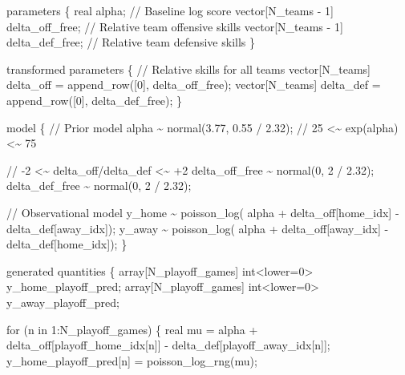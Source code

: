 \documentclass[
  letterpaper,
  DIV=11,
  numbers=noendperiod]{scrartcl}
\newenvironment{Shaded}{\begin{snugshade}}{\end{snugshade}}
\newcommand{\CommentTok}[1]{\textcolor[rgb]{0.37,0.37,0.37}{#1}}
\newcommand{\ControlFlowTok}[1]{\textcolor[rgb]{0.00,0.23,0.31}{#1}}
\newcommand{\DataTypeTok}[1]{\textcolor[rgb]{0.68,0.00,0.00}{#1}}
\newcommand{\DecValTok}[1]{\textcolor[rgb]{0.68,0.00,0.00}{#1}}
\newcommand{\FloatTok}[1]{\textcolor[rgb]{0.68,0.00,0.00}{#1}}
\newcommand{\KeywordTok}[1]{\textcolor[rgb]{0.00,0.23,0.31}{#1}}
\newcommand{\NormalTok}[1]{\textcolor[rgb]{0.00,0.23,0.31}{#1}}
\begin{document}
\begin{codelisting}
\begin{Shaded}
\begin{Highlighting}[]
\KeywordTok{parameters}\NormalTok{ \{}
  \DataTypeTok{real}\NormalTok{ alpha;                         }\CommentTok{// Baseline log score}
  \DataTypeTok{vector}\NormalTok{[N\_teams {-} }\DecValTok{1}\NormalTok{] delta\_off\_free; }\CommentTok{// Relative team offensive skills}
  \DataTypeTok{vector}\NormalTok{[N\_teams {-} }\DecValTok{1}\NormalTok{] delta\_def\_free; }\CommentTok{// Relative team defensive skills}
\NormalTok{\}}

\KeywordTok{transformed parameters}\NormalTok{ \{}
  \CommentTok{// Relative skills for all teams}
  \DataTypeTok{vector}\NormalTok{[N\_teams] delta\_off = append\_row([}\DecValTok{0}\NormalTok{]\textquotesingle{}, delta\_off\_free);}
  \DataTypeTok{vector}\NormalTok{[N\_teams] delta\_def = append\_row([}\DecValTok{0}\NormalTok{]\textquotesingle{}, delta\_def\_free);}
\NormalTok{\}}

\KeywordTok{model}\NormalTok{ \{}
  \CommentTok{// Prior model}
\NormalTok{  alpha \textasciitilde{} normal(}\FloatTok{3.77}\NormalTok{, }\FloatTok{0.55}\NormalTok{ / }\FloatTok{2.32}\NormalTok{); }\CommentTok{// 25 \textless{}\textasciitilde{}  exp(alpha) \textless{}\textasciitilde{} 75}

  \CommentTok{// {-}2 \textless{}\textasciitilde{} delta\_off/delta\_def \textless{}\textasciitilde{} +2}
\NormalTok{  delta\_off\_free \textasciitilde{} normal(}\DecValTok{0}\NormalTok{, }\DecValTok{2}\NormalTok{ / }\FloatTok{2.32}\NormalTok{);}
\NormalTok{  delta\_def\_free \textasciitilde{} normal(}\DecValTok{0}\NormalTok{, }\DecValTok{2}\NormalTok{ / }\FloatTok{2.32}\NormalTok{);}

  \CommentTok{// Observational model}
\NormalTok{  y\_home \textasciitilde{} poisson\_log(  alpha}
\NormalTok{                       + delta\_off[home\_idx] {-} delta\_def[away\_idx]);}
\NormalTok{  y\_away \textasciitilde{} poisson\_log(  alpha}
\NormalTok{                       + delta\_off[away\_idx] {-} delta\_def[home\_idx]);}
\NormalTok{\}}

\KeywordTok{generated quantities}\NormalTok{ \{}
  \DataTypeTok{array}\NormalTok{[N\_playoff\_games] }\DataTypeTok{int}\NormalTok{\textless{}}\KeywordTok{lower}\NormalTok{=}\DecValTok{0}\NormalTok{\textgreater{} y\_home\_playoff\_pred;}
  \DataTypeTok{array}\NormalTok{[N\_playoff\_games] }\DataTypeTok{int}\NormalTok{\textless{}}\KeywordTok{lower}\NormalTok{=}\DecValTok{0}\NormalTok{\textgreater{} y\_away\_playoff\_pred;}

  \ControlFlowTok{for}\NormalTok{ (n }\ControlFlowTok{in} \DecValTok{1}\NormalTok{:N\_playoff\_games) \{}
    \DataTypeTok{real}\NormalTok{ mu =  alpha}
\NormalTok{             + delta\_off[playoff\_home\_idx[n]]}
\NormalTok{             {-} delta\_def[playoff\_away\_idx[n]];}
\NormalTok{    y\_home\_playoff\_pred[n] = poisson\_log\_rng(mu);}


\end{Highlighting}
\end{Shaded}
\end{codelisting}
\end{document}
